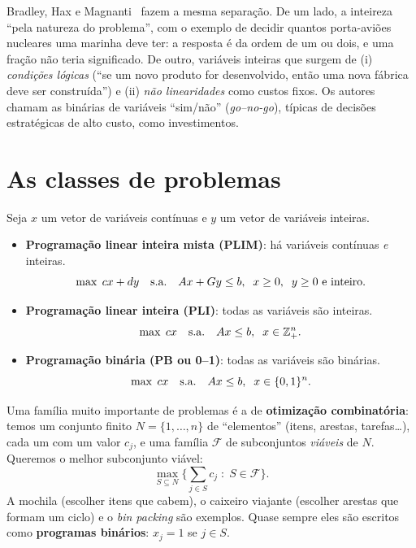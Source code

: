 \begin{outros}
Bradley, Hax e Magnanti~\cite[Seç.~9.2]{amp} fazem a mesma separação. De um lado, a inteireza ``pela natureza do
problema'', com o exemplo de decidir quantos porta-aviões nucleares uma marinha deve ter: a resposta é da ordem de
um ou dois, e uma fração não teria significado. De outro, variáveis inteiras que surgem de (i) \emph{condições
lógicas} (``se um novo produto for desenvolvido, então uma nova fábrica deve ser construída'') e (ii)
\emph{não linearidades} como custos fixos. Os autores chamam as binárias de variáveis ``sim/não'' (\emph{go--no-go}),
típicas de decisões estratégicas de alto custo, como investimentos.
\end{outros}

\section{As classes de problemas}

\begin{definicao}
Seja $x$ um vetor de variáveis contínuas e $y$ um vetor de variáveis inteiras.
\begin{itemize}
  \item \textbf{Programação linear inteira mista (PLIM)}: há variáveis contínuas \emph{e} inteiras.
  \[ \max\; cx + dy \quad \text{s.a.}\quad Ax + Gy \le b,\;\; x \ge 0,\;\; y \ge 0 \text{ e inteiro.}\]
  \item \textbf{Programação linear inteira (PLI)}: todas as variáveis são inteiras.
  \[ \max\; cx \quad \text{s.a.}\quad Ax \le b,\;\; x \in \mathbb{Z}^n_+.\]
  \item \textbf{Programação binária (PB ou 0--1)}: todas as variáveis são binárias.
  \[ \max\; cx \quad \text{s.a.}\quad Ax \le b,\;\; x \in \{0,1\}^n.\]
\end{itemize}
\end{definicao}

Uma família muito importante de problemas é a de \textbf{otimização combinatória}: temos um conjunto finito
$N=\{1,\dots,n\}$ de ``elementos'' (itens, arestas, tarefas\ldots), cada um com um valor $c_j$, e uma família
$\mathcal{F}$ de subconjuntos \emph{viáveis} de $N$. Queremos o melhor subconjunto viável:
\[
\max_{S\subseteq N}\Big\{\sum_{j\in S} c_j \;:\; S\in\mathcal{F}\Big\}.
\]
A mochila (escolher itens que cabem), o caixeiro viajante (escolher arestas que formam um ciclo) e o \emph{bin
packing} são exemplos. Quase sempre eles são escritos como \textbf{programas binários}: $x_j=1$ se $j\in S$.

